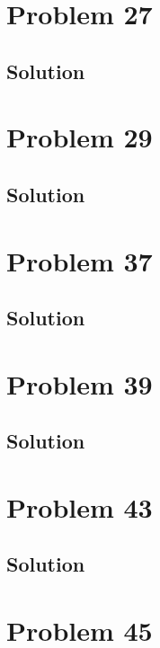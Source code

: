\documentclass[12pt]{article}
\begin{document}
    \pagebreak
    \section{Problem 27}

        \subsection{Solution}

    \pagebreak
    \section{Problem 29}

        \subsection{Solution}

    \pagebreak
    \section{Problem 37}

        \subsection{Solution}

    \pagebreak
    \section{Problem 39}

        \subsection{Solution}

    \pagebreak
    \section{Problem 43}

        \subsection{Solution}

    \pagebreak
    \section{Problem 45}
\end{document}
